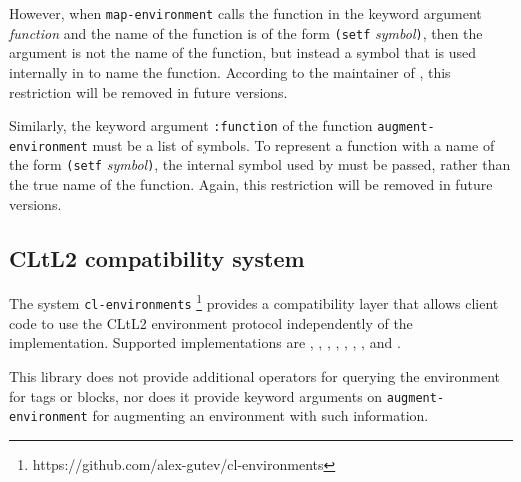 However, when \texttt{map-environment} calls the function in the
keyword argument \textit{function} and the name of the function is of
the form \texttt{(setf} \textit{symbol}\texttt{)}, then the argument
is not the name of the function, but instead a symbol that is used
internally in \lispworks{} to name the function.  According to the
maintainer of \lispworks{}, this restriction will be removed in future
versions.

Similarly, the keyword argument \texttt{:function} of the function
\texttt{augment-environment} must be a list of symbols.  To represent
a function with a name of the form \texttt{(setf}
\textit{symbol}\texttt{)}, the internal symbol used by \lispworks{}
must be passed, rather than the true name of the function.  Again,
this restriction will be removed in future versions.

\subsection{CLtL2 compatibility system}

The system \texttt{cl-environments}%
\footnote{https://github.com/alex-gutev/cl-environments}
provides a compatibility layer that allows client code to use the
CLtL2 environment protocol independently of the \commonlisp{}
implementation.  Supported \commonlisp{} implementations are \clisp{},
\ccl{}, \ecl{}, \abcl{}, \cmucl{}, \sbcl{}, \allegro{}, and
\lispworks{}.

This library does not provide additional operators for querying the
environment for tags or blocks, nor does it provide keyword arguments
on \texttt{augment-environment} for augmenting an environment with
such information.
